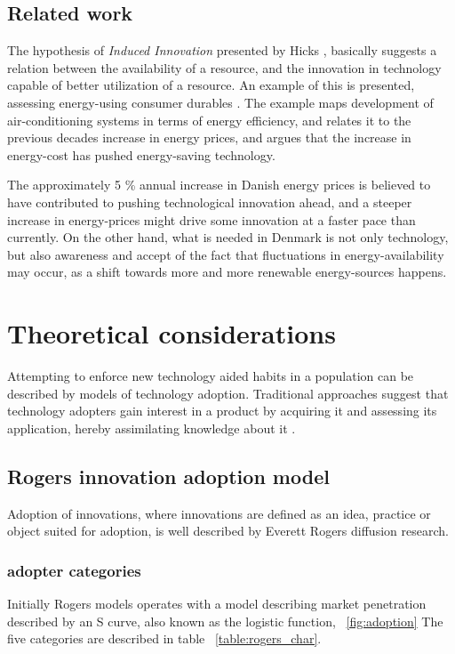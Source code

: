 \documentclass[journal]{IEEEtran}
\begin{document}
\subsection{Related work}
The hypothesis of \textit{Induced Innovation} presented by Hicks \cite{Hicks}, basically suggests a relation between the availability of a resource, and the innovation in technology capable of better utilization of a resource. 
An example of this is presented, assessing energy-using consumer durables \cite{newell}. The example maps development of air-conditioning systems in terms of energy efficiency, and relates it to the previous decades increase in energy prices, and argues that the increase in energy-cost has pushed energy-saving technology.\newline

The approximately 5 \% annual increase in Danish energy prices is believed to have contributed to pushing technological innovation ahead, and a steeper increase in energy-prices might drive some innovation at a faster pace than currently.
On the other hand, what is needed in Denmark is not only technology, but also awareness and accept of the fact that fluctuations in energy-availability may occur, as a shift towards more and more renewable energy-sources happens.
  

\section{Theoretical considerations}
Attempting to enforce new technology aided habits in a population can be described by models of technology adoption. 
Traditional approaches suggest that technology adopters gain interest in a product by acquiring it and assessing its application, hereby assimilating knowledge about it \cite{gilbert}.

\subsection{Rogers innovation adoption model}
Adoption of innovations, where innovations are defined as an idea, practice or object suited for adoption, is well described by Everett Rogers diffusion research.

\subsubsection{adopter categories}
Initially Rogers models \cite{rogers_model} operates with a model describing market penetration described by an S curve, also known as the logistic function, ~\ref{fig:adoption}
The five categories are described in table ~\ref{table:rogers_char}. \newline
\end{document}
